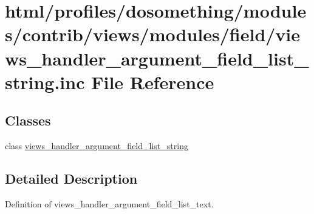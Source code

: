 \hypertarget{views__handler__argument__field__list__string_8inc}{
\section{html/profiles/dosomething/modules/contrib/views/modules/field/views\_\-handler\_\-argument\_\-field\_\-list\_\-string.inc File Reference}
\label{views__handler__argument__field__list__string_8inc}
}
\subsection*{Classes}
\begin{DoxyCompactItemize}
\item 
class \hyperlink{classviews__handler__argument__field__list__string}{views\_\-handler\_\-argument\_\-field\_\-list\_\-string}
\end{DoxyCompactItemize}


\subsection{Detailed Description}
Definition of views\_\-handler\_\-argument\_\-field\_\-list\_\-text. 